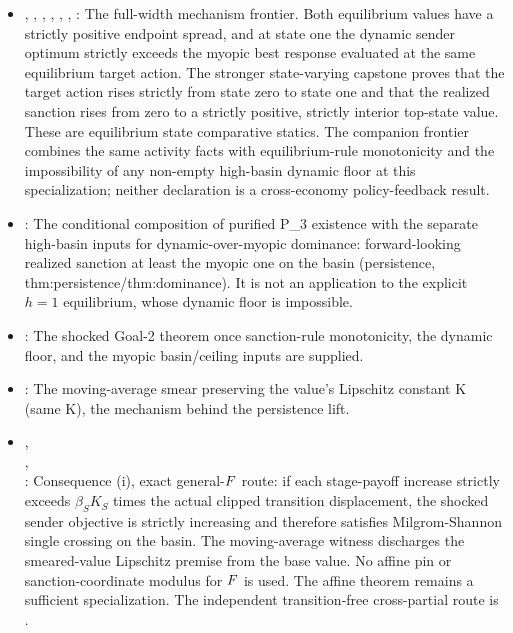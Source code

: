 \begin{itemize}[leftmargin=1.4em,itemsep=1pt]
\item {},
,
,
,
,
,
:
The full-width mechanism frontier. Both equilibrium values have a
strictly positive endpoint spread, and at state one the dynamic sender
optimum strictly exceeds the myopic best response evaluated at the same
equilibrium target action. The stronger state-varying capstone proves that
the target action rises strictly from state zero to state one and that the
realized sanction rises from zero to a strictly positive, strictly interior
top-state value. These are equilibrium state comparative statics. The
companion frontier combines the same activity facts with equilibrium-rule
monotonicity and the impossibility of any non-empty high-basin dynamic floor
at this specialization; neither declaration is a cross-economy
policy-feedback result.
\item {}: The conditional composition of purified P\_3 existence with the separate high-basin inputs for dynamic-over-myopic dominance: forward-looking realized sanction at least the myopic one on the basin (persistence, thm:persistence/thm:dominance). It is not an application to the explicit $h=1$ equilibrium, whose dynamic floor is impossible.
\item {}: The shocked Goal-2 theorem once sanction-rule monotonicity, the dynamic floor, and the myopic basin/ceiling inputs are supplied.
\item {}: The moving-average smear preserving the value's Lipschitz constant K (same K), the mechanism behind the persistence lift.
\item {},\\
,\\
: Consequence (i), exact general-$F$ route: if each stage-payoff increase strictly exceeds $\beta_S K_S$ times the actual clipped transition displacement, the shocked sender objective is strictly increasing and therefore satisfies Milgrom-Shannon single crossing on the basin.  The moving-average witness discharges the smeared-value Lipschitz premise from the base value.  No affine pin or sanction-coordinate modulus for $F$ is used.  The affine theorem  remains a sufficient specialization.  The independent transition-free cross-partial route is .

\end{itemize}
